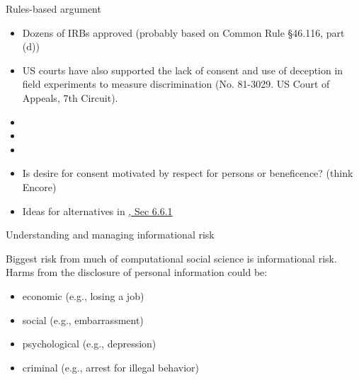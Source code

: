 \documentclass{beamer}
\begin{document}
\begin{frame}

Rules-based argument
\begin{itemize}
\item Dozens of IRBs approved (probably based on Common Rule §46.116, part (d))
\pause
\item US courts have also supported the lack of consent and use of deception in field experiments to measure discrimination (No. 81-3029.
US Court of Appeals, 7th Circuit).
\end{itemize}

\end{frame}
\begin{frame}

\begin{itemize}
\item {}
\item {}
\item {}
\end{itemize}

\end{frame}
\begin{frame}

\begin{itemize}
\item Is desire for consent motivated by respect for persons or beneficence? (think Encore)
\pause
\item Ideas for alternatives in \href{https://www.bitbybitbook.com/en/1st-ed/ethics/dilemmas/consent/}{, Sec 6.6.1}
\end{itemize}

\end{frame}
\begin{frame}

\begin{center}
\Large{Understanding and managing informational risk}
\end{center}

\end{frame}
\begin{frame}

Biggest risk from much of computational social science is informational risk.  Harms from the disclosure of personal information could be: 

\begin{itemize}
\item economic (e.g., losing a job)
\item social (e.g., embarrassment)
\item psychological (e.g., depression)
\item criminal (e.g., arrest for illegal behavior)
\end{itemize}

\end{frame}
\end{document}
